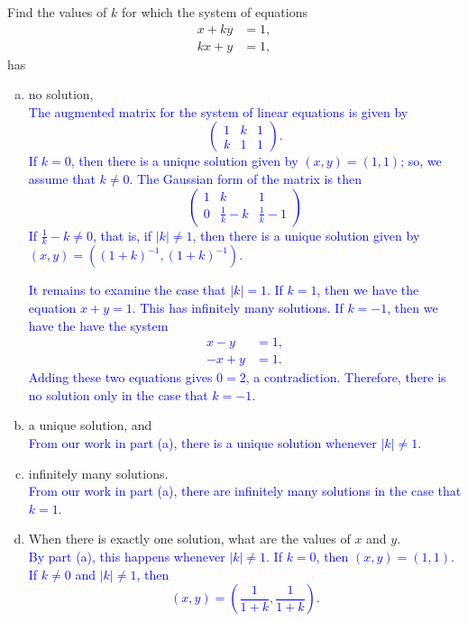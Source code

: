 \documentclass[a4paper,11pt]{article}
\newcommand{\BB}[1]{\textcolor{blue}{#1}}
\newcommand{\abs}[1]{\vert #1 \vert}
\begin{document}
 Find the values of $k$ for which the system of
equations
\begin{align*}
  x + ky &= 1, \\
  kx + y &= 1,
\end{align*}
has
\begin{enumerate}[(a)]
\item no solution, \\

  \BB{
    The augmented matrix for the system of linear equations is given by
    \[
      \left(
        \begin{array}{rr|r}
          1 & k & 1 \\
          k & 1 & 1
        \end{array}
      \right).
    \]
    If $k=0$, then there is a unique solution given by $(x,y)=(1,1)$; so, we
    assume that $k \neq 0$. The Gaussian form of the matrix is then
    \[
      \left(
        \begin{array}{rr|r}
          1 & k & 1 \\
          0 & \frac{1}{k}-k & \frac{1}{k}-1
        \end{array}
      \right)
    \]
    If $\frac{1}{k}-k \neq 0$, that is, if $\abs{k} \neq 1$, then there is a
    unique solution given by $(x,y) = ((1+k)^{-1},(1+k)^{-1})$.
  }

  \BB{
    It remains to examine the case that $\abs{k}=1$. If $k=1$, then we have the
    equation $x+y=1$. This has infinitely many solutions. If $k=-1$, then we
    have the have the system
    \begin{align*}
      x-y &= 1, \\
      -x+y &= 1.
    \end{align*}
    Adding these two equations gives $0=2$, a contradiction. Therefore, there
    is no solution only in the case that $k=-1$. \\
  }
  
\item a unique solution, and \\

  \BB{
    From our work in part (a), there is a unique solution whenever $\abs{k} \neq
    1$. \\
  }

\item infinitely many solutions. \\

  \BB{
    From our work in part (a), there are infinitely many solutions in the case
    that $k=1$. \\
  }
  
\item When there is exactly one solution, what are the values of $x$ and $y$. \\

  \BB{
    By part (a), this happens whenever $\abs{k} \neq 1$. If $k=0$, then
    $(x,y)=(1,1)$. If $k \neq 0$ and $\abs{k} \neq 1$, then 
    \[
      (x,y) = \left( \frac{1}{1+k}, \frac{1}{1+k} \right).
    \]
  }
\end{enumerate}
\end{document}
